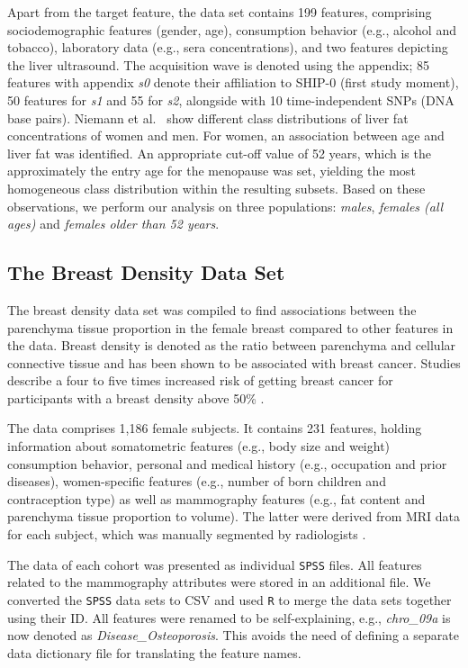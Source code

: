 \documentclass[journal]{style/vgtc} 			          %
\begin{document}
Apart from the target feature, the data set contains 199 features, comprising sociodemographic features (gender, age), consumption behavior (e.g., alcohol and tobacco), laboratory data (e.g., sera concentrations), and two features depicting the liver ultrasound.
The acquisition wave is denoted using the appendix; 85 features with appendix \emph{s0} denote their affiliation to SHIP-0 (first study moment), 50 features for \emph{s1} and 55 for \emph{s2}, alongside with 10 time-independent SNPs (DNA base pairs).
Niemann et al.~\cite{Niemann2014} show different class distributions of liver fat concentrations of women and men.
For women, an association between age and liver fat was identified.
An appropriate cut-off value of 52 years, which is the approximately the entry age for the menopause was set, yielding the most homogeneous class distribution within the resulting subsets.
Based on these observations, we perform our analysis on three populations: \emph{males}, \emph{females (all ages)} and \emph{females older than 52 years}.
\subsection{The Breast Density Data Set}
The breast density data set was compiled to find associations between the parenchyma tissue proportion in the female breast compared to other features in the data.
Breast density is denoted as the ratio between parenchyma and cellular connective tissue and has been shown to be associated with breast cancer.
Studies describe a four to five times increased risk of getting breast cancer for participants with a breast density above 50\% \cite{Mccormack2006}.

The data comprises 1,186 female subjects. %
It contains 231 features, holding information about somatometric features (e.g., body size and weight) consumption behavior, personal and medical history (e.g., occupation and prior diseases), women-specific features (e.g., number of born children and contraception type) as well as mammography features (e.g., fat content and parenchyma tissue proportion to volume).
The latter were derived from MRI data for each subject, which was manually segmented by radiologists \cite{Hegenscheid2009, Ivanovska2014}.

The data of each cohort was presented as individual \texttt{SPSS} files.
All features related to the mammography attributes were stored in an additional file.
We converted the \texttt{SPSS} data sets to CSV and used \texttt{R} to merge the data sets together using their ID.
All features were renamed to be self-explaining, e.g., \emph{chro\_09a} is now denoted as \emph{Disease\_Osteoporosis}.
This avoids the need of defining a separate data dictionary file for translating the feature names.
\end{document}
